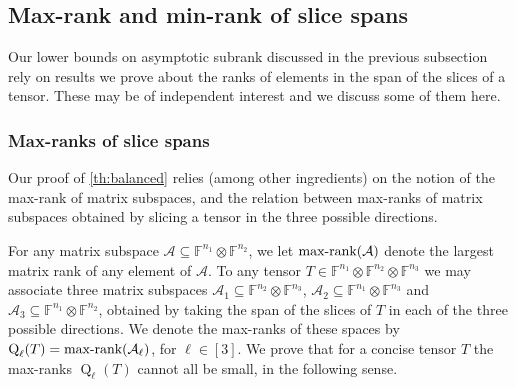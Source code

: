 \documentclass{daj}
\DeclareMathOperator{\subrank}{Q}
\newcommand{\FF}{\mathbb{F}}
\begin{document}
%

%
%
%
%
%
%

\subsection{Max-rank and min-rank of slice spans}

Our lower bounds on asymptotic subrank discussed in the previous subsection rely on results we prove about the ranks of elements in the span of the slices of a tensor. These may be of independent interest and we discuss some of them here.

\subsubsection{Max-ranks of slice spans}

%
%

%
%

Our proof of \autoref{th:balanced} relies (among other ingredients) on the notion of the max-rank of matrix subspaces, and the relation between max-ranks of matrix subspaces obtained by slicing a tensor in the three possible directions.

For any matrix subspace $\mathcal{A} \subseteq \FF^{n_1} \otimes \FF^{n_2}$, we let $\textnormal{max-rank}(\mathcal{A})$ denote the largest matrix rank of any element of $\mathcal{A}$. 
%
To any tensor $T \in \FF^{n_1} \otimes \FF^{n_2} \otimes \FF^{n_3}$ we may associate three matrix subspaces 
$\mathcal{A}_1 \subseteq \FF^{n_2} \otimes \FF^{n_3}$, $\mathcal{A}_2 \subseteq \FF^{n_1} \otimes \FF^{n_3}$ and $\mathcal{A}_3 \subseteq \FF^{n_1} \otimes \FF^{n_2}$, obtained by taking the span of the slices of $T$ in each of the three possible directions. We denote the max-ranks of these spaces by $\subrank_\ell(T) = \textnormal{max-rank}(\mathcal{A}_\ell)$, for $\ell \in [3]$. We prove that for a concise tensor $T$ the max-ranks $\subrank_\ell(T)$ cannot all be small, in the following sense.

%
%

%

\end{document}
